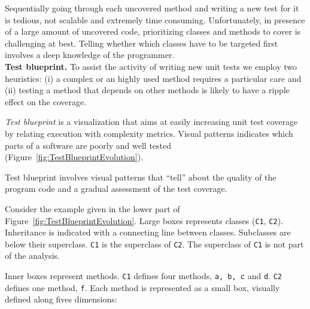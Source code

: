 \documentclass[runningheads]{llncs}
\newcommand{\ct}{\lstinline[backgroundcolor=\color{white},basicstyle=\footnotesize\ttfamily]}
\newcommand{\sd}[1]{\nb{SD}{orange}{#1}}
\newcommand{\figref}[1]{Figure~\ref{fig:#1}}
\newcommand{\myparagraph}[1]{\noindent \textbf{#1.}}
\begin{document}
Sequentially going through each uncovered method and writing a new test for it is tedious, not scalable and extremely time consuming. Unfortunately, in presence of a large amount of uncovered code, prioritizing classes and methods to cover is challenging at best. Telling whether which classes have to be targeted first involves a deep knowledge of the programmer. \\

\myparagraph{Test blueprint}
To assist the activity of writing new unit tests we employ two heuristics: (i) a complex or an highly used method requires a particular care and (ii) testing a method that depends on other methods is likely to have a ripple effect on the coverage.

\emph{Test blueprint} is a visualization that aims at easily increasing unit test coverage by relating execution with complexity metrics. Visual patterns indicates which parts of a software are poorly and well tested (\figref{TestBlueprintEvolution}).

Test blueprint involves visual patterns that ``tell'' about the quality of the program code and a gradual assessment of the test coverage.

Consider the example given in the lower part of \figref{TestBlueprintEvolution}. Large boxes represents classes (\ct{C1}, \ct{C2}). Inheritance is indicated with a connecting line between classes. Subclasses are below their superclass. \ct{C1} is the superclass of \ct{C2}. The superclass of \ct{C1} is not part of the analysis.

Inner boxes represent methods. \ct{C1} defines four methods, \ct{a, b, c} and \ct {d}. \ct{C2} defines one method, \ct{f}. Each method is represented as a small box, visually defined along fives dimensions:
\end{document}
